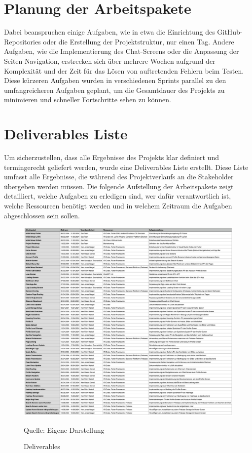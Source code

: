 \section{Planung der Arbeitspakete}
Dabei beanspruchen einige Aufgaben, wie in etwa die Einrichtung des GitHub-Repositories oder die Erstellung der Projektstruktur, nur einen Tag. 
Andere Aufgaben, wie die Implementierung des Chat-Screens oder die Anpassung der Seiten-Navigation, erstrecken sich über mehrere Wochen aufgrund der Komplexität und der Zeit für das Lösen von auftretenden Fehlern beim Testen.
Diese kürzeren Aufgaben wurden in verschiedenen Sprints parallel zu den umfangreicheren Aufgaben geplant, um die Gesamtdauer des Projekts zu minimieren und schneller Fortschritte sehen zu können.
\newpage
\section{Deliverables Liste}
Um sicherzustellen, dass alle Ergebnisse des Projekts klar definiert und termingerecht geliefert werden, wurde eine Deliverables Liste erstellt.
Diese Liste umfasst alle Ergebnisse, die während des Projektverlaufs an die Stakeholder übergeben werden müssen.
Die folgende Aufstellung der Arbeitspakete zeigt detailliert, welche Aufgaben zu erledigen sind, wer dafür verantwortlich ist, welche Ressourcen benötigt werden und in welchem Zeitraum die Aufgaben abgeschlossen sein sollen.

\begin{figure}[H]
	\setcounter{figure}{2} 
	\caption[Deliverables]{Deliverables}
	\centering
	\includegraphics[width=1.0\textwidth]{assets/figures/Deliverables_liste.png}
	\begin{flushleft}
		Quelle: Eigene Darstellung
	\end{flushleft}
\end{figure}
\newpage

